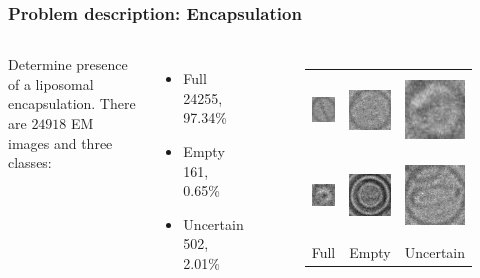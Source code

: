 \documentclass{beamer}
\begin{document}
\begin{frame}
\frametitle{Problem description: Encapsulation}

\begin{columns}
Determine presence of a liposomal encapsulation.
\vskip 0.2in
There are $24918$ EM images and three classes:
\begin{itemize}
\item Full \\ 24255, 97.34\%
\item Empty \\ 161, 0.65\%
\item Uncertain \\ 502, 2.01\%
\end{itemize}
\begin{figure}[H]
\centering
\begin{tabular}{ccc}
	\includegraphics[height=2cm, keepaspectratio]{problem_description/packiging/full} & \includegraphics[height=2cm, keepaspectratio]{problem_description/packiging/empty} & \includegraphics[height=2cm, keepaspectratio]{problem_description/packiging/uncertain} \\
	\includegraphics[height=2cm, keepaspectratio]{problem_description/packiging/full2} & \includegraphics[height=2cm, keepaspectratio]{problem_description/packiging/empty2} & \includegraphics[height=2cm, keepaspectratio]{problem_description/packiging/uncertain2} \\
Full & Empty & Uncertain \\[6pt]
\end{tabular}
\end{figure}
\end{columns}

\end{frame}
\end{document}
